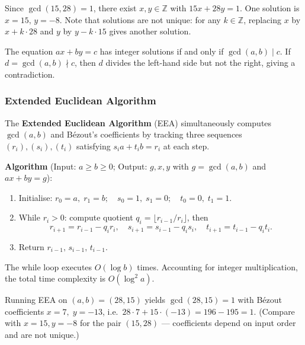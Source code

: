 \begin{example}
Since $\gcd(15,28)=1$, there exist $x,y \in \mathbb{Z}$ with $15x + 28y = 1$. One solution is $x=15,\, y=-8$. Note that solutions are not unique: for any $k \in \mathbb{Z}$, replacing $x$ by $x + k\cdot 28$ and $y$ by $y - k \cdot 15$ gives another solution.
\end{example}

\begin{remark}
The equation $ax + by = c$ has integer solutions if and only if $\gcd(a,b) \mid c$. If $d = \gcd(a,b) \nmid c$, then $d$ divides the left-hand side but not the right, giving a contradiction.
\end{remark}

\subsubsection*{Extended Euclidean Algorithm}

The \textbf{Extended Euclidean Algorithm} (EEA) simultaneously computes $\gcd(a,b)$ and Bézout's coefficients by tracking three sequences $(r_i), (s_i), (t_i)$ satisfying $s_i a + t_i b = r_i$ at each step.

\medskip
\noindent\textbf{Algorithm} (Input: $a \geq b \geq 0$; Output: $g, x, y$ with $g = \gcd(a,b)$ and $ax+by=g$):
\begin{enumerate}
    \item Initialise: $r_0=a,\; r_1=b;\quad s_0=1,\; s_1=0;\quad t_0=0,\; t_1=1$.
    \item While $r_i > 0$: compute quotient $q_i = \lfloor r_{i-1}/r_i \rfloor$, then
    \[
    r_{i+1} = r_{i-1} - q_i r_i, \quad s_{i+1} = s_{i-1} - q_i s_i, \quad t_{i+1} = t_{i-1} - q_i t_i.
    \]
    \item Return $r_{i-1},\, s_{i-1},\, t_{i-1}$.
\end{enumerate}

\begin{remark}
The while loop executes $O(\log b)$ times. Accounting for integer multiplication, the total time complexity is $O(\log^2 a)$.
\end{remark}

\begin{example}
Running EEA on $(a,b) = (28,15)$ yields $\gcd(28,15)=1$ with Bézout coefficients $x=7,\; y=-13$, i.e.\ $28 \cdot 7 + 15 \cdot (-13) = 196 - 195 = 1$. (Compare with $x=15, y=-8$ for the pair $(15,28)$ — coefficients depend on input order and are not unique.)
\end{example}

